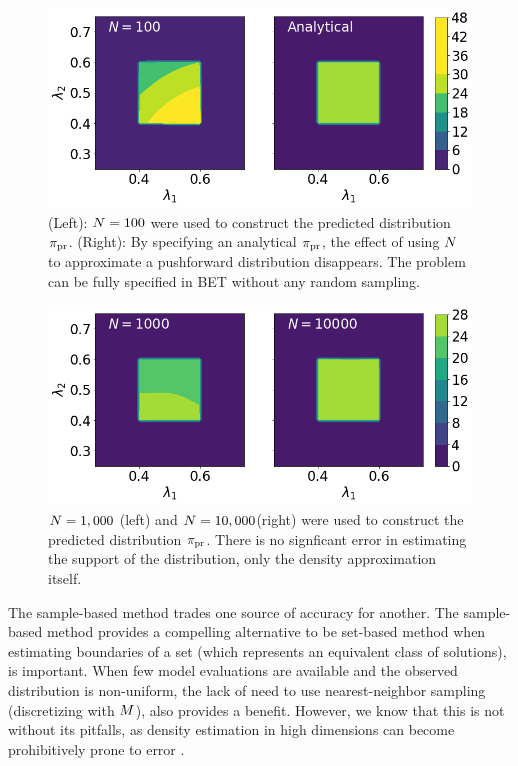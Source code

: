 \begin{figure}
\begin{minipage}{.975\textwidth}
\includegraphics[width=\linewidth]{./examples/identity/samp/N100_N100-vs-Analytical_N100.png}
\end{minipage}
\caption{
(Left): $N=100$ were used to construct the predicted distribution $\operatorname*{\pi_{pr}}$.
(Right): By specifying an analytical $\operatorname*{\pi_{pr}}$, the effect of using $N$ to approximate a pushforward distribution disappears. The problem can be fully specified in BET without any random sampling.
}
\label{fig:ex:identity_sampling_1E2}
\end{figure}

\begin{figure}
\begin{minipage}{.975\textwidth}
\includegraphics[width=\linewidth]{./examples/identity/samp/N1000_N1000-vs-N10000_N10000.png}
\end{minipage}
\caption{
$N=1,000$ (left) and $N=10,000$(right) were used to construct the predicted distribution $\operatorname*{\pi_{pr}}$.
There is no signficant error in estimating the support of the distribution, only the density approximation itself.
}
\label{fig:ex:identity_sampling_1E3_1E4}
\end{figure}


The sample-based method trades one source of accuracy for another.
The sample-based method provides a compelling alternative to be set-based method when estimating boundaries of a set (which represents an equivalent class of solutions), is important.
When few model evaluations are available and the observed distribution is non-uniform, the lack of need to use nearest-neighbor sampling (discretizing with $M$), also provides a benefit.
However, we know that this is not without its pitfalls, as density estimation in high dimensions can become prohibitively prone to error \cite{Silverman}.
